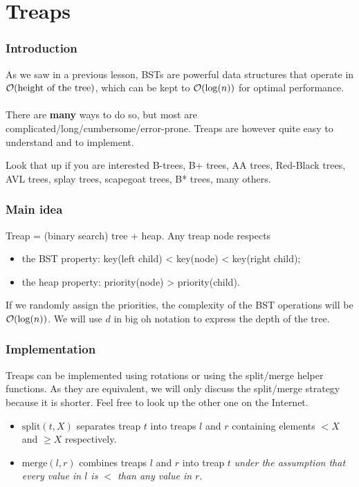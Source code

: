 \section{Treaps}

\begin{frame}
	\frametitle{Introduction}
	As we saw in a previous lesson, BSTs are powerful data structures that operate in $\mathcal O(\text{height of the tree})$, which can be kept to $\mathcal O(\log(n))$ for optimal performance. \\~\\
	
	There are \textbf{many} ways to do so, but most are complicated/long/cumbersome/error-prone.
	Treaps are however quite easy to understand and to implement.
	
	\begin{block}{Look that up if you are interested}
		B-trees, B+ trees, AA trees, Red-Black trees, AVL trees, splay trees, scapegoat trees, B* trees, many others.
	\end{block}
	
\end{frame}

\begin{frame}
	\frametitle{Main idea}
	Treap = (binary search) tree + heap. Any treap node respects
	\begin{itemize}
		\item the BST property: key(left child) < key(node) < key(right child);
		\item the heap property: priority(node) > priority(child).
	\end{itemize}
	If we randomly assign the priorities, the complexity of the BST operations will be $\mathcal O(\log(n))$. We will use $d$ in big oh notation to express the depth of the tree.
\end{frame}

\begin{frame}
	\frametitle{Implementation}
	Treaps can be implemented using rotations or using the split/merge helper functions.
	As they are equivalent, we will only discuss the split/merge strategy because it is shorter. Feel free to look up the other one on the Internet.
	\begin{itemize}
		\item $\mathrm{split} (t, X)$ separates treap $t$ into treaps $l$ and $r$ containing elements $< X$ and $\ge X$ respectively.
		\item $\mathrm{merge} (l, r)$ combines treaps $l$ and $r$ into treap $t$ \textit{under the assumption that every value in $l$ is $<$ than any value in $r$}.
	\end{itemize}
\end{frame}

